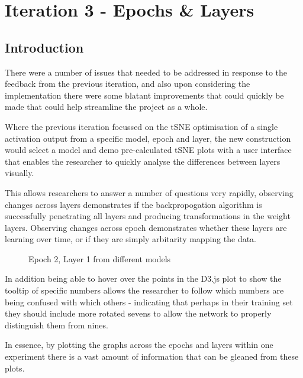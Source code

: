\documentclass[a4paper,11pt,titlepage]{article}
\begin{document}
\clearpage 
				
\section{Iteration 3 - Epochs \& Layers}
	\subsection{Introduction}
	There were a number of issues that needed to be addressed in response to the feedback from the previous iteration, and also upon considering the implementation there were some blatant improvements that could quickly be made that could help streamline the project as a whole. 
	\par 
	Where the previous iteration focussed on the tSNE optimisation of a single activation output from a specific model, epoch and layer, the new construction would select a model and demo pre-calculated tSNE plots  with a user interface that enables the researcher to quickly analyse the differences between layers visually.
	\par 
	This allows researchers to answer a number of questions very rapidly, observing changes across layers demonstrates if the backpropogation algorithm is successfully penetrating all layers and producing transformations in the weight layers. Observing changes across epoch demonstrates whether these layers are learning over time, or if they are simply arbitarity mapping the data. 
	\par 
		
	\begin{figure}[H]
    			\caption{Epoch 2, Layer 1 from different models}%
	\end{figure}	
	
	In addition being able to hover over the points in the D3.js plot to show the tooltip of specific numbers allows the researcher to follow which numbers are being confused with which others - indicating that perhaps in their training set they should include more rotated sevens to allow the network to properly distinguish them from nines. 
	\par 
	In essence, by plotting the graphs across the epochs and layers within one experiment there is a vast amount of information that can be gleaned from these plots.
	
\end{document}
